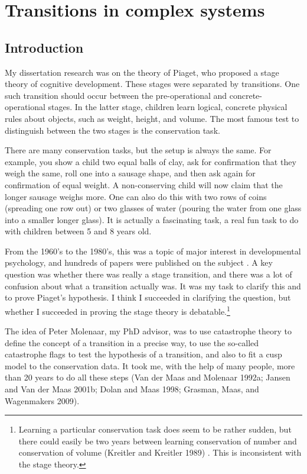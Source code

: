 \documentclass[
  a4paper,
  DIV=11,
  numbers=noendperiod,
  oneside]{scrreprt}
\begin{document}

\hypertarget{sec-ch3}{%
\chapter{Transitions in complex systems}\label{sec-ch3}}

\hypertarget{sec-Introduction}{%
\section{Introduction}\label{sec-Introduction}}

My dissertation research was on the theory of Piaget, who proposed a
stage theory of cognitive development. These stages were separated by
transitions. One such transition should occur between the
pre-operational and concrete-operational stages. In the latter stage,
children learn logical, concrete physical rules about objects, such as
weight, height, and volume. The most famous test to distinguish between
the two stages is the conservation task.

There are many conservation tasks, but the setup is always the same. For
example, you show a child two equal balls of clay, ask for confirmation
that they weigh the same, roll one into a sausage shape, and then ask
again for confirmation of equal weight. A non-conserving child will now
claim that the longer sausage weighs more. One can also do this with two
rows of coins (spreading one row out) or two glasses of water (pouring
the water from one glass into a smaller longer glass). It is actually a
fascinating task, a real fun task to do with children between 5 and 8
years old.

From the 1960's to the 1980's, this was a topic of major interest in
developmental psychology, and hundreds of papers were published on the
subject . A key question was whether there was really a stage
transition, and there was a lot of confusion about what a transition
actually was. It was my task to clarify this and to prove Piaget's
hypothesis. I think I succeeded in clarifying the question, but whether
I succeeded in proving the stage theory is debatable.\footnote{Learning
  a particular conservation task does seem to be rather sudden, but
  there could easily be two years between learning conservation of
  number and conservation of volume (Kreitler and Kreitler 1989) . This
  is inconsistent with the stage theory.}

The idea of Peter Molenaar, my PhD advisor, was to use catastrophe
theory to define the concept of a transition in a precise way, to use
the so-called catastrophe flags to test the hypothesis of a transition,
and also to fit a cusp model to the conservation data. It took me, with
the help of many people, more than 20 years to do all these steps (Van
der Maas and Molenaar 1992a; Jansen and Van der Maas 2001b; Dolan and
Maas 1998; Grasman, Maas, and Wagenmakers 2009).
\end{document}
